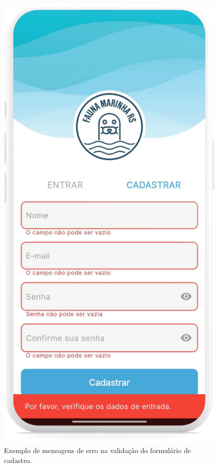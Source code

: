 \begin{figure}[H]
    \hfill
    \begin{minipage}[t]{0.48\textwidth}
        \centering
        \includegraphics[height=0.72\textheight]{imagens/sistema/device_frame/formularioCadastro_erro.png}
        \caption{Exemplo de mensagens de erro na validação do formulário de cadastro.}
        \label{fig:cadastro-erro}
    \end{minipage}
\end{figure}


